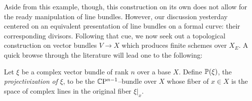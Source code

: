 Aside from this example, though, this construction on its own does not allow for the ready manipulation of line bundles.  However, our discussion yesterday centered on an equivalent presentation of line bundles on a formal curve: their corresponding divisors.  Following that cue, we now seek out a topological construction on vector bundles $V \to X$ which produces finite schemes over $X_E$.  A quick browse through the literature will lead one to the following:
\begin{definition}
Let $\xi$ be a complex vector bundle of rank $n$ over a base $X$.  Define $\P(\xi)$, the \textit{projectivization of $\xi$}, to be the $\CP^{n-1}$--bundle over $X$ whose fiber of $x \in X$ is the space of complex lines in the original fiber $\xi|_x$.
\end{definition}

